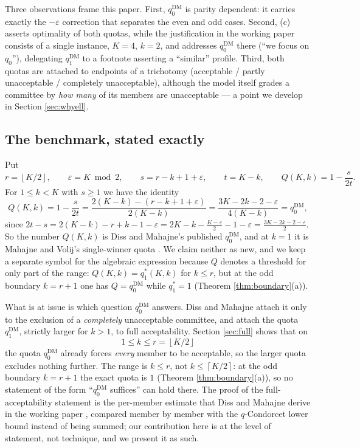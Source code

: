 \documentclass[11pt]{article}
\theoremstyle{plain}
\theoremstyle{definition}
\newcommand{\cl}[1]{\left\lceil #1\right\rceil}
\newcommand{\fl}[1]{\left\lfloor #1\right\rfloor}
\newcommand{\eps}{\varepsilon}
\newcommand{\DM}{\mathrm{DM}}
\begin{document}
Three observations frame this paper. First, $q_0^{\DM}$ is parity dependent: it carries exactly the $-\eps$ correction that separates the even and odd cases. Second, (c) asserts optimality of both quotas, while the justification in the working paper consists of a single instance, $K=4$, $k=2$, and addresses $q_0^{\DM}$ there (``we focus on $q_0$''), delegating $q_1^{\DM}$ to a footnote asserting a ``similar'' profile. Third, both quotas are attached to endpoints of a trichotomy (acceptable / partly unacceptable / completely unacceptable), although the model itself grades a committee by \emph{how many} of its members are unacceptable --- a point we develop in Section \ref{sec:whyell}.

\subsection{The benchmark, stated exactly}

Put
\begin{equation}
\label{eq:Q}
r=\fl{K/2},\qquad \eps=K\bmod2,\qquad s=r-k+1+\eps,\qquad t=K-k,
\qquad Q(K,k)=1-\frac{s}{2t}.
\end{equation}
For $1\le k<K$ with $s\ge1$ we have the identity
\begin{equation}
\label{eq:identity}
Q(K,k)=1-\frac{s}{2t}=\frac{2(K-k)-(r-k+1+\eps)}{2(K-k)}=\frac{3K-2k-2-\eps}{4(K-k)}=q_0^{\DM},
\end{equation}
since $2t-s=2(K-k)-r+k-1-\eps=2K-k-\frac{K-\eps}{2}-1-\eps=\frac{3K-2k-2-\eps}{2}$. So the number $Q(K,k)$ is Diss and Mahajne's published $q_0^{\DM}$, and at $k=1$ it is Mahajne and Volij's single-winner quota \cite{MahajneVolij2019}. We claim neither as new, and we keep a separate symbol for the algebraic expression because $Q$ denotes a threshold for only part of the range: $Q(K,k)=q_1^*(K,k)$ for $k\le r$, but at the odd boundary $k=r+1$ one has $Q=q_0^{\DM}$ while $q_1^*=1$ (Theorem \ref{thm:boundary}(a)).

What is at issue is which question $q_0^{\DM}$ answers. Diss and Mahajne attach it only to the exclusion of a \emph{completely} unacceptable committee, and attach the quota $q_1^{\DM}$, strictly larger for $k>1$, to full acceptability. Section \ref{sec:full} shows that on
\begin{equation}
\label{eq:rangefull}
1\le k\le r=\fl{K/2}
\end{equation}
the quota $q_0^{\DM}$ already forces \emph{every} member to be acceptable, so the larger quota excludes nothing further. The range is $k\le r$, not $k\le\cl{K/2}$: at the odd boundary $k=r+1$ the exact quota is $1$ (Theorem \ref{thm:boundary}(a)), so no statement of the form ``$q_0^{\DM}$ suffices'' can hold there. The proof of the full-acceptability statement is the per-member estimate that Diss and Mahajne derive in the working paper \cite[pp.~8--10]{DissMahajne2019}, compared member by member with the $q$-Condorcet lower bound instead of being summed; our contribution here is at the level of statement, not technique, and we present it as such.
\end{document}
